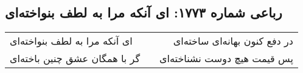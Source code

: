 \begin{center}
\section*{رباعی شماره ۱۷۷۳: ای آنکه مرا به لطف بنواخته‌ای}
\label{sec:1773}
\begin{longtable}{l p{0.5cm} r}
ای آنکه مرا به لطف بنواخته‌ای
&&
در دفع کنون بهانه‌ای ساخته‌ای
\\
گر با همگان عشق چنین باخته‌ای
&&
پس قیمت هیچ دوست نشناخته‌ای
\\
\end{longtable}
\end{center}
